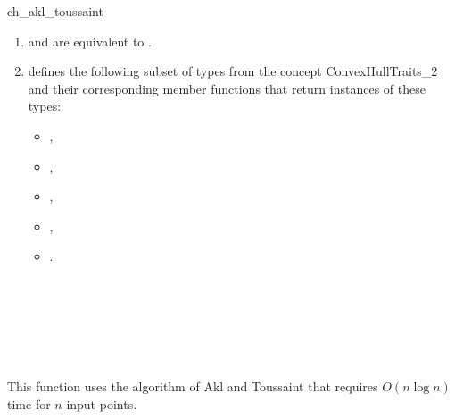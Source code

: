 \begin{ccRefFunction}{ch_akl_toussaint}
\begin{enumerate}
   \item    {} and 
            are equivalent to .
   \item    {} defines the following subset of types from
            the concept ConvexHullTraits\_2 and their corresponding member
            functions that return instances of these types:
            \begin{itemize}
                \item {},
                \item {}, 
                \item {},
                \item {}, 
                \item {}.
            \end{itemize}
\end{enumerate}


\ccSeeAlso

 \\
 \\
 \\
 \\
 \\

\ccImplementation

This function uses the algorithm of Akl and
Toussaint \cite{at-fcha-78} that requires $O(n \log n)$ time for $n$ input
points.  

\end{ccRefFunction}


